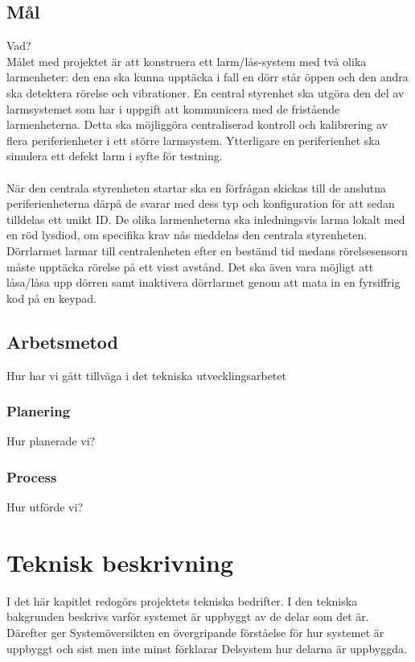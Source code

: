 \documentclass{article}
\begin{document}
\subsection{Mål}
Vad?
\\
Målet med projektet är att konstruera ett larm/lås-system med två olika larmenheter: 
den ena ska kunna upptäcka i fall en dörr står öppen och den andra ska detektera rörelse och vibrationer. 
En central styrenhet ska utgöra den del av larmsystemet som har i uppgift att kommunicera med de fristående larmenheterna. 
Detta ska möjliggöra centraliserad kontroll och kalibrering av flera periferienheter i ett större larmsystem. 
Ytterligare en periferienhet ska simulera ett defekt larm i syfte för testning.
\\\\
När den centrala styrenheten startar ska en förfrågan skickas till de anslutna periferienheterna därpå de svarar med dess typ och konfiguration för att sedan tilldelas ett unikt ID. De olika larmenheterna ska inledningsvis larma lokalt med en röd lysdiod, om specifika krav nås meddelas den centrala styrenheten. Dörrlarmet larmar till centralenheten efter en bestämd tid medans rörelsesensorn måste upptäcka rörelse på ett visst avstånd. Det ska även vara möjligt att låsa/låsa upp dörren samt inaktivera dörrlarmet genom att mata in en fyrsiffrig kod på en keypad.


\subsection{Arbetsmetod}
Hur har vi gått tillväga i det tekniska utvecklingsarbetet

\subsubsection{Planering}
Hur planerade vi?

\subsubsection{Process}
Hur utförde vi?


\section{Teknisk beskrivning}
I det här kapitlet redogörs projektets tekniska bedrifter. 
I den tekniska bakgrunden beskrivs varför systemet är uppbyggt av de delar som det är.
Därefter ger Systemöversikten en övergripande förståelse för hur systemet är uppbyggt och sist men inte minst förklarar Delsystem hur delarna är uppbyggda.
\end{document}
